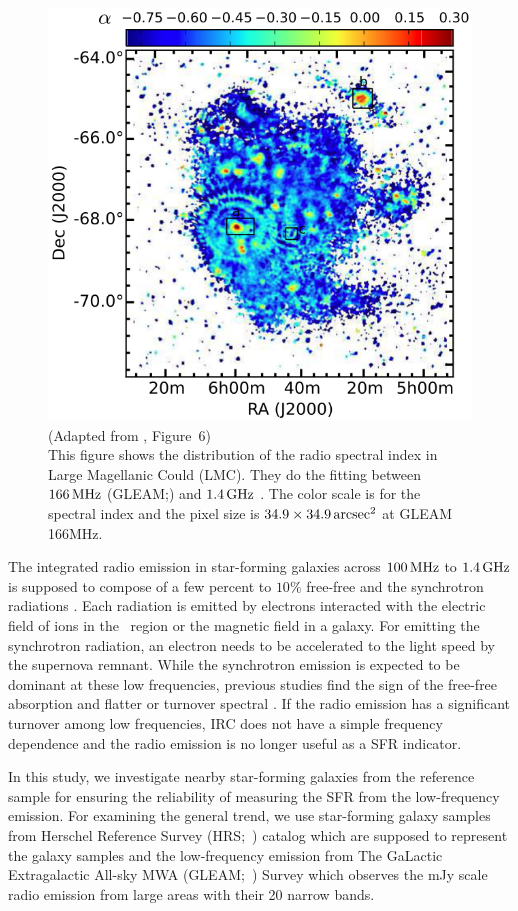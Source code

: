 \begin{figure}[htbp]
	\centering
	\includegraphics[width=.6\linewidth]{Chapter_1/Figures/For2018_Figure6.png}
    \caption[Adapted from \citet{For2018a} (Figure~6)]{\label{fig:For2018_Figure6}
        (Adapted from \citet{For2018a}, Figure~6)\\
        This figure shows the distribution of the radio spectral index in Large Magellanic Could (LMC).
        They do the fitting between $166\,\mathrm{MHz}$ (GLEAM;\@\citealt{Hurley-Walker2017a}) and $1.4\,\mathrm{GHz}$ \citep{Hughes2007}.
        The color scale is for the spectral index and the pixel size is $34.9 \times 34.9 \,\mathrm{arcsec}^2$ at GLEAM 166MHz.
    }
\end{figure}

The integrated radio emission in star-forming galaxies across $100\,\mathrm{MHz}$ to $1.4\,\mathrm{GHz}$ is supposed to compose of a few percent to $10\%$ free-free and the synchrotron radiations \citep{Condon1992a}.
Each radiation is emitted by electrons interacted with the electric field of ions in the \ih~region or the magnetic field in a galaxy.
For emitting the synchrotron radiation, an electron needs to be accelerated to the light speed by the supernova remnant.
While the synchrotron emission is expected to be dominant at these low frequencies, previous studies find the sign of the free-free absorption and flatter or turnover spectral \citep{Schober2017, Chyzy2018}.
If the radio emission has a significant turnover among low frequencies, IRC does not have a simple frequency dependence and the radio emission is no longer useful as a SFR indicator.

In this study, we investigate nearby star-forming galaxies from the reference sample for ensuring the reliability of measuring the SFR from the low-frequency emission.
For examining the general trend, we use star-forming galaxy samples from Herschel Reference Survey (HRS;~\citealt{Boselli2010}) catalog which are supposed to represent the galaxy samples and the low-frequency emission from The GaLactic Extragalactic All-sky MWA (GLEAM;~\citealt{Hurley-Walker2017a}) Survey which observes the mJy scale radio emission from large areas with their 20 narrow bands.

